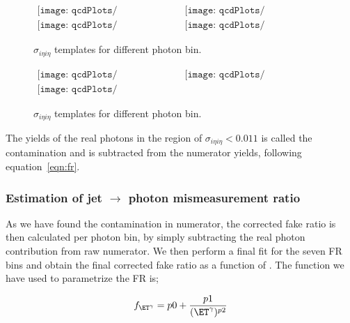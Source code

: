 \begin{figure}[hbtp]
\begin{center} 
$\begin{array}{cc}
\texttt{[image: qcdPlots/qcd\_template\_1]} &
\texttt{[image: qcdPlots/qcd\_template\_2]} \\
\texttt{[image: qcdPlots/qcd\_template\_3]} &
\texttt{[image: qcdPlots/qcd\_template\_4]}
\end{array} $
\caption{$\sigma_{i\eta i\eta}$ templates for different photon \et bin.}
\label{fig:medTemplates1}
\end{center}
\end{figure}
\begin{figure}[hbtp]
\begin{center} 
$\begin{array}{cc}
\texttt{[image: qcdPlots/qcd\_template\_5]} &
\texttt{[image: qcdPlots/qcd\_template\_6]} \\
\texttt{[image: qcdPlots/qcd\_template\_7]} &
\end{array} $
\caption{$\sigma_{i\eta i\eta}$ templates for different photon \et bin.}
\label{fig:medTemplates2}
\end{center}
\end{figure}

The yields of the real photons in the region of $\sigma_{i\eta i\eta}<0.011$ is called the contamination and is subtracted from the numerator yields, following equation~\ref{eqn:fr}.

\subsubsection{Estimation of jet $\rightarrow$ photon mismeasurement ratio} 
As we have found the contamination in numerator, the corrected fake ratio is then calculated per photon \et bin, by simply subtracting the real photon contribution from raw numerator. We then perform a final fit for the seven FR bins and obtain the final corrected fake ratio as a function of \et.
The function we have used to parametrize the FR is;

\begin{equation}
f_{\ET^{\gamma}} = p0 + \frac{p1}{(\ET^{\gamma})^{p2}}
\end{equation}

